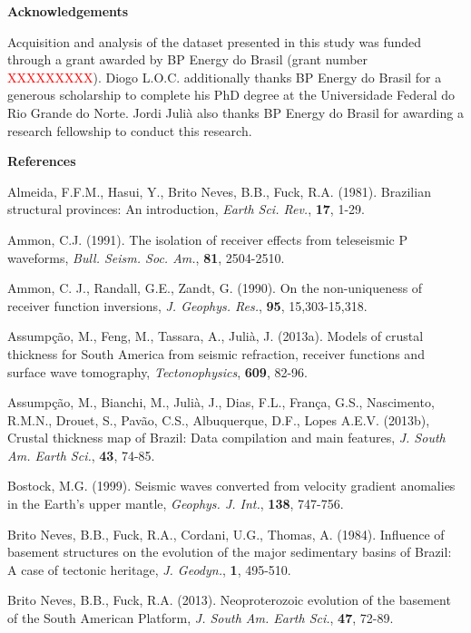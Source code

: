 \documentclass[manuscript,11pt]{geophysics}
\begin{document}
\begin{flushleft}
\textbf{\LARGE Acknowledgements}
\end{flushleft}

Acquisition and analysis of the dataset presented in this study was funded through a grant awarded by BP Energy do Brasil (grant number \textcolor{red}{XXXXXXXXX}). Diogo L.O.C. additionally thanks BP Energy do Brasil for a generous scholarship to complete his PhD degree at the Universidade Federal do Rio Grande do Norte. Jordi Juli\`a also thanks BP Energy do Brasil for awarding a research fellowship to conduct this research.

\pagebreak
\begin{flushleft}
\textbf{\LARGE References}
\end{flushleft}

Almeida, F.F.M., Hasui, Y., Brito Neves, B.B., Fuck, R.A. (1981). Brazilian structural provinces: An introduction, \textit{Earth Sci. Rev.}, \textbf{17}, 1-29.

Ammon, C.J. (1991). The isolation of receiver effects from teleseismic P waveforms, \textit{Bull. Seism. Soc. Am.}, \textbf{81}, 2504-2510.

Ammon, C. J., Randall, G.E., Zandt, G. (1990). On the non-uniqueness of receiver function inversions, \textit{J. Geophys. Res.}, \textbf{95}, 15,303-15,318.

Assump\c{c}\~ao, M., Feng, M., Tassara, A., Juli\`a, J. (2013a). Models of crustal thickness for South America from seismic refraction, receiver functions and surface wave tomography, \textit{Tectonophysics}, \textbf{609}, 82-96.

Assump\c{c}\~ao, M., Bianchi, M., Juli\`a, J., Dias, F.L., Fran\c{c}a, G.S., Nascimento, R.M.N., Drouet, S., Pav\~ao, C.S., Albuquerque, D.F., Lopes A.E.V. (2013b), Crustal thickness map of Brazil: Data compilation and main features, \textit{J. South Am. Earth Sci.}, \textbf{43}, 74-85.

Bostock, M.G. (1999). Seismic waves converted from velocity gradient anomalies in the Earth's upper mantle, \textit{Geophys. J. Int.}, \textbf{138}, 747-756.

Brito Neves, B.B., Fuck, R.A., Cordani, U.G., Thomas, A. (1984). Influence of basement structures on the evolution of the major sedimentary basins of Brazil: A case of tectonic heritage, \textit{J. Geodyn.}, \textbf{1}, 495-510.

Brito Neves, B.B., Fuck, R.A. (2013). Neoproterozoic evolution of the basement of the South American Platform, \textit{J. South Am. Earth Sci.}, \textbf{47}, 72-89.
\end{document}
